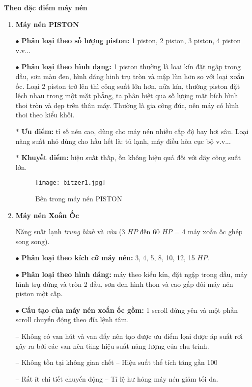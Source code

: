	\textbf{Theo đặc điểm máy nén}
	\begin{enumerate}[leftmargin=0.5cm]
		\setlength\itemsep{1mm}
		\item \textbf{Máy nén PISTON}
		
		$ \bullet $ \textbf{Phân loại theo số lượng piston:} 1 piston, 2 piston, 3 piston, 4 piston v.v...
		
		$ \bullet $ \textbf{Phân loại theo hình dạng:} 1 piston thường là loại kín đặt ngập trong dầu, sơn màu đen, hình dáng hinh trụ tròn và mập lùn hơn so với loại xoắn ốc. Loại 2 piston trở lên thì công suất lớn hơn, nữa kín, thường piston đặt lệch nhau trong một mặt phẳng, ta phân biệt qua số lượng mặt bích hình thoi tròn và dẹp trên thân máy. Thường là gia công đúc, nên máy có hình thoi theo kiểu khối.
		
		$ \ast $ \textbf{Ưu điểm:} tỉ số nén cao, dùng cho máy nén nhiều cấp độ bay hơi sâu. Loại năng suất nhỏ dùng cho hầu hết là: tủ lạnh, máy điều hòa cục bộ v.v...
		
		$ \ast $ \textbf{Khuyết điểm:} hiệu suất thấp, ồn không hiệu quả đối với dãy công suất lớn.
		
\begin{figure}[H]
	\centering
	\texttt{[image: bitzer1.jpg]}
	\caption{Bên trong máy nén PISTON}
\end{figure}		
		
		\item \textbf{Máy nén Xoắn Ốc} 
		
		Năng suất lạnh \textit{trung bình} và \textit{vừa} (3 $ HP $ đến 60 $ HP $ = 4 máy xoắn ốc ghép song song).
		
		$ \bullet $ \textbf{Phân loại theo kích cỡ máy nén:} 3, 4, 5, 8, 10, 12, 15 $ HP $.
		
		$ \bullet $ \textbf{Phân loại theo hình dáng:} máy theo kiểu kín, đặt ngập trong dầu, máy hình trụ đứng và tròn 2 đầu, sơn đen hình thon và cao gấp đôi máy nén piston một cấp.
		
		$ \bullet $ \textbf{Cấu tạo của máy nén xoắn ốc gồm:} 1 scroll đứng yên và một phần scroll chuyển động theo đĩa lệnh tâm.
		
		-- Không có van hút và van đẩy nên tạo được ưu điểm lọai được áp suất rơi gây ra bởi các van nên tăng hiệu suất năng lượng của chu trình.
		
		-- Không tồn tại không gian chết – Hiệu suất thể tích tăng gần 100%
		
		-- Rất ít chi tiết chuyển động – Tỉ lệ hư hỏng máy nén giảm tối đa.
		

\end{enumerate}
